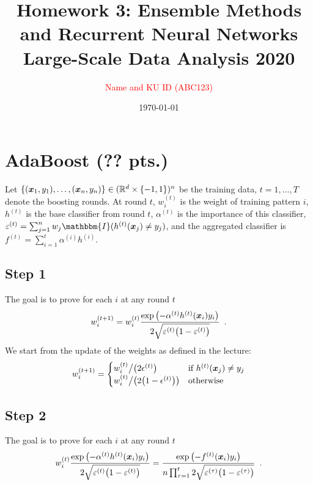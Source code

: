 \documentclass[a4paper,11pt]{article}
\def\vec#1{\mathchoice{\mbox{\boldmath$\displaystyle#1$}}
{\mbox{\boldmath$\textstyle#1$}}
{\mbox{\boldmath$\scriptstyle#1$}}
{\mbox{\boldmath$\scriptscriptstyle#1$}}}
\begin{document}
\title{Homework 3: Ensemble Methods and Recurrent Neural Networks\\[0.5ex]\Large{Large-Scale Data Analysis 2020}}
\author{\textcolor{red}{Name and KU ID (ABC123)}}
\date{\today}
\maketitle


\newcommand{\tsize}{n}
\newcommand{\indicator}{\mathbbm{I}}

\section{AdaBoost (?? pts.)}
Let $\{(\vec{x}_1,y_1),\ldots,(\vec{x}_\tsize,y_\tsize)\} \in (\mathbb{R}^d\times\{-1,1\})^\tsize   $ be the training data,   $t= 1,  \dots, T$ denote the boosting rounds. 
At round $t$, 
$w_i^{(t)}$ is the weight of training pattern $i$, $h^{(t)}$ is the base classifier from round $t$,
$\alpha^{(t)}$ is
the  importance  of this classifier, $\varepsilon^{(t)} = \sum_{j=1}^\tsize w_j \indicator (h^{(t)}(\vec{x}_j) \neq y_j)$, and the aggregated classifier is
$f^{(t)} = \sum_{i=1}^t \alpha^{(i)} h^{(i)}$. 

\subsection{Step 1}
The goal is to prove for each $i$ at any round $t$
\begin{equation}
 w_i^{(t+1)} =   w_i^{(t)} \frac{\exp\left(-\alpha^{(t)}  h^{(t)}(\vec x_i) y_i
    \right)}{2\sqrt{ \varepsilon^{(t)}
      \big(1-\varepsilon^{(t)} \big)}}\enspace.
\end{equation}
We start from the update of the weights as defined in the lecture:
\begin{equation}
    w_i^{(t+1)} =\begin{cases}
    w_i^{(t)}\big/\big(2\epsilon^{(t)}\big) & \text{if $h^{(t)} (\vec{x}_j) \neq y_j$}\\
    w_i^{(t)}\big/\big(2\big(1-\epsilon^{(t)}\big)\big) & \text{otherwise}
    \end{cases}
\end{equation}

\subsection{Step 2}
The goal is to prove for each $i$ at any round $t$
\begin{equation}
  w_i^{(t)} \frac{\exp\left(-\alpha^{(t)}  h^{(t)}(\vec x_i) y_i
    \right)}{2\sqrt{ \varepsilon^{(t)}
      \big(1-\varepsilon^{(t)} \big)}}
=   \frac{\exp\left(-f^{(t)}(\vec x_i) y_i
    \right)}{\tsize \prod_{\tau=1}^{t}2\sqrt{ \varepsilon^{(\tau)}
      \big(1-\varepsilon^{(\tau)} \big)}}\enspace.
\end{equation}
\end{document}
